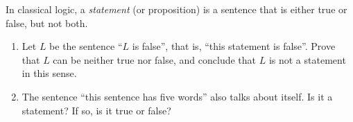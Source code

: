 In classical logic, a \emph{statement} (or proposition) is a sentence that is either true or false, but not both.
\begin{enumerate}
\item[(a)] Let $L$ be the sentence ``$L$ is false'', that is, ``this statement is false''. Prove that $L$ can be neither true nor false, and conclude that $L$ is not a statement in this sense.
\item[(b)] The sentence ``this sentence has five words'' also talks about itself. Is it a statement? If so, is it true or false?
\end{enumerate}
